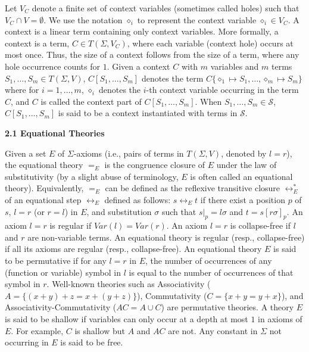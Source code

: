 \documentclass[10pt,a4paper]{amsart}
\begin{document}
 
 
Let $V_{C}$ denote a finite set of context variables (sometimes called holes) such that $V_{C}\cap V=\emptyset$. We use the notation $\diamond_{i}$ to represent the context variable $\diamond_{i}\in V_{C}$. A context is a linear term containing only context variables. More formally, a context is a term, $C\in T(\Sigma,V_{C})$, where each variable (context hole) occurs at most once. Thus, the size of a context follows from the size of a term, where any hole occurrence counts for $1$. Given a context $C$ with $m$ variables and $m$ terms $S_{1},\dots,S_{m}\in T(\Sigma,V)$, $C[S_{1},\dots,S_{m}]$ denotes the term $C\{\diamond_{1}\mapsto S_{1},\dots,\diamond_{m}\mapsto S_{m}\}$ where for $i=1,\dots,m$, $\diamond_{i}$ denotes the $i$-th context variable occurring in the term $C$, and $C$ is called the context part of $C[S_{1},\dots,S_{m}]$. When $S_{1},\dots,S_{m}\in\mathcal{S}$, $C[S_{1},\dots,S_{m}]$ is said to be a context instantiated with terms in $\mathcal{S}$.\par
 
 
 
\par\medskip\noindent\textbf{2.1 Equational Theories}\par
 
 
Given a set $E$ of $\Sigma$-axioms (i.e., pairs of terms in $T(\Sigma,V)$, denoted by $l=r$), the equational theory $=_{E}$ is the congruence closure of $E$ under the law of substitutivity (by a slight abuse of terminology, $E$ is often called an equational theory). Equivalently, $=_{E}$ can be defined as the reflexive transitive closure $\leftrightarrow_{E}^{*}$ of an equational step $\leftrightarrow_{E}$ defined as follows: $s\leftrightarrow_{E}t$ if there exist a position $p$ of $s$, $l=r$ (or $r=l$) in $E$, and substitution $\sigma$ such that $s|_{p}=l\sigma$ and $t=s[r\sigma]_{p}$. An axiom $l=r$ is regular if $\mathit{Var}(l)=\mathit{Var}(r)$. An axiom $l=r$ is collapse-free if $l$ and $r$ are non-variable terms. An equational theory is regular (resp., collapse-free) if all its axioms are regular (resp., collapse-free). An equational theory $E$ is said to be permutative if for any $l=r$ in $E$, the number of occurrences of any (function or variable) symbol in $l$ is equal to the number of occurrences of that symbol in $r$. Well-known theories such as Associativity ($A=\{(x+y)+z=x+(y+z)\}$), Commutativity ($C=\{x+y=y+x\}$), and Associativity-Commutativity ($AC=A\cup C$) are permutative theories. A theory $E$ is said to be shallow if variables can only occur at a depth at most $1$ in axioms of $E$. For example, $C$ is shallow but $A$ and $AC$ are not. Any constant in $\Sigma$ not occurring in $E$ is said to be free.\par
 
\end{document}
